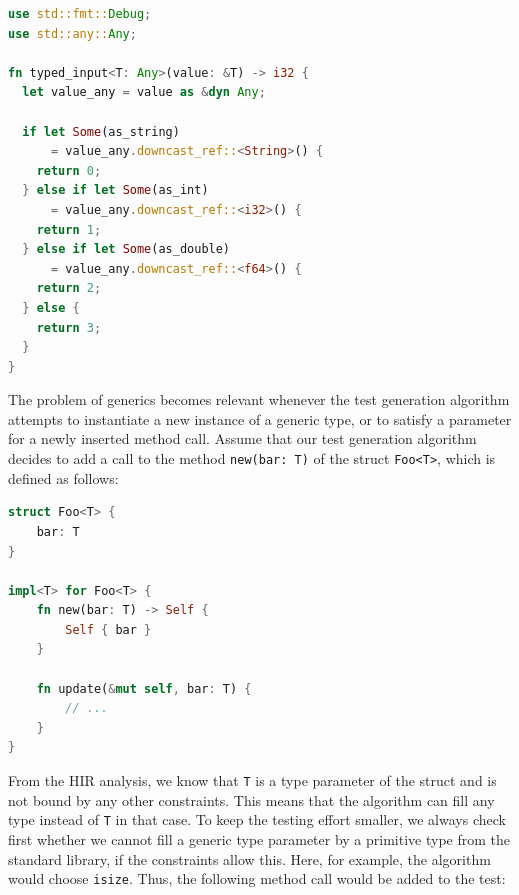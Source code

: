\documentclass[paper=a4,%
  twoside,%
  BCOR4mm,%
  abstract=true,%
  toc=bibliography,%
  chapterprefix=true,%
  toc=bibliographynumbered,%
  open=right,%
  english,%
  pagesize=pdftex]{scrreprt}
\begin{document}
\begin{lstlisting}[language=Rust, style=boxed, caption={The execution path of the generic Rust function depends on the concrete type of the argument}, label=lst:rust-runtime-reflection]
use std::fmt::Debug;
use std::any::Any;

fn typed_input<T: Any>(value: &T) -> i32 {
  let value_any = value as &dyn Any;

  if let Some(as_string)
      = value_any.downcast_ref::<String>() {
    return 0;
  } else if let Some(as_int)
      = value_any.downcast_ref::<i32>() {
    return 1;
  } else if let Some(as_double)
      = value_any.downcast_ref::<f64>() {
    return 2;
  } else {
    return 3;
  }
}
\end{lstlisting}

The problem of generics becomes relevant whenever the test generation algorithm attempts to instantiate a new instance of a generic type, or to satisfy a parameter for a newly inserted method call. Assume that our test generation algorithm decides to add a call to the method \lstinline{new(bar: T)} of the struct \lstinline{Foo<T>}, which is defined as follows:
\begin{lstlisting}[language=Rust, style=boxed, caption={}, label=lst:basic-generics-example]
struct Foo<T> {
    bar: T
}

impl<T> for Foo<T> {
    fn new(bar: T) -> Self {
        Self { bar }
    }

    fn update(&mut self, bar: T) {
        // ...
    }
}
\end{lstlisting}


From the \ac{HIR} analysis, we know that \lstinline{T} is a type parameter of the struct and is not bound by any other constraints. This means that the algorithm can fill any type instead of \lstinline{T} in that case. To keep the testing effort smaller, we always check first whether we cannot fill a generic type parameter by a primitive type from the standard library, if the constraints allow this. Here, for example, the algorithm would choose \lstinline{isize}. Thus, the following method call would be added to the test:
\end{document}
